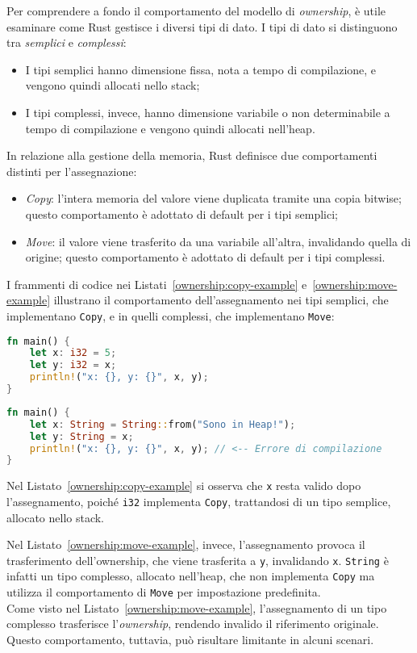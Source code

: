 Per comprendere a fondo il comportamento del modello di \textit{ownership}, è utile esaminare come Rust gestisce i diversi tipi di dato. I tipi di dato si distinguono tra \textit{semplici} e \textit{complessi}:
\begin{itemize}
    \item I tipi semplici hanno dimensione fissa, nota a tempo di compilazione, e vengono quindi allocati nello stack;
    \item I tipi complessi, invece, hanno dimensione variabile o non determinabile a tempo di compilazione e vengono quindi allocati nell'heap.
\end{itemize}
In relazione alla gestione della memoria, Rust definisce due comportamenti distinti per l'assegnazione:
\begin{itemize}
    \item \textit{Copy}: l'intera memoria del valore viene duplicata tramite una copia bitwise; questo comportamento è adottato di default per i tipi semplici;
    \item \textit{Move}: il valore viene trasferito da una variabile all'altra, invalidando quella di origine; questo comportamento è adottato di default per i tipi complessi.
\end{itemize}

\noindent I frammenti di codice nei Listati~\ref{ownership:copy-example} e~\ref{ownership:move-example} illustrano il comportamento dell'assegnamento nei tipi semplici, che implementano \texttt{Copy}, e in quelli complessi, che implementano \texttt{Move}:
\begin{lstlisting}[language=Rust, caption={Comportamento di Copy}, label={ownership:copy-example}]
fn main() {
    let x: i32 = 5;
    let y: i32 = x;
    println!("x: {}, y: {}", x, y);
}
\end{lstlisting}
\begin{lstlisting}[language=Rust, caption={Comportamento di Move}, label={ownership:move-example}]
fn main() {
    let x: String = String::from("Sono in Heap!");
    let y: String = x;
    println!("x: {}, y: {}", x, y); // <-- Errore di compilazione
}
\end{lstlisting}
Nel Listato~\ref{ownership:copy-example} si osserva che \texttt{x} resta valido dopo l'assegnamento, poiché \texttt{i32} implementa \texttt{Copy}, trattandosi di un tipo semplice, allocato nello stack.

Nel Listato~\ref{ownership:move-example}, invece, l'assegnamento provoca il trasferimento dell'ownership, che viene trasferita a \texttt{y}, invalidando \texttt{x}. \texttt{String} è infatti un tipo complesso, allocato nell'heap, che non implementa \texttt{Copy} ma utilizza il comportamento di \texttt{Move} per impostazione predefinita. \hfill
\vspace{10pt}\\
\noindent Come visto nel Listato~\ref{ownership:move-example}, l'assegnamento di un tipo complesso trasferisce l'\textit{ownership}, rendendo invalido il riferimento originale. Questo comportamento, tuttavia, può risultare limitante in alcuni scenari.

